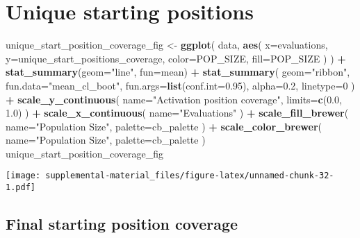 \documentclass[]{book}
\newenvironment{Shaded}{\begin{snugshade}}{\end{snugshade}}
\newcommand{\DataTypeTok}[1]{\textcolor[rgb]{0.13,0.29,0.53}{#1}}
\newcommand{\DecValTok}[1]{\textcolor[rgb]{0.00,0.00,0.81}{#1}}
\newcommand{\FloatTok}[1]{\textcolor[rgb]{0.00,0.00,0.81}{#1}}
\newcommand{\KeywordTok}[1]{\textcolor[rgb]{0.13,0.29,0.53}{\textbf{#1}}}
\newcommand{\NormalTok}[1]{#1}
\newcommand{\OperatorTok}[1]{\textcolor[rgb]{0.81,0.36,0.00}{\textbf{#1}}}
\newcommand{\StringTok}[1]{\textcolor[rgb]{0.31,0.60,0.02}{#1}}
\begin{document}
\hypertarget{unique-starting-positions-2}{%
\section{Unique starting positions}\label{unique-starting-positions-2}}

\begin{Shaded}
\begin{Highlighting}[]
\NormalTok{unique_start_position_coverage_fig <-}\StringTok{ }\KeywordTok{ggplot}\NormalTok{(}
\NormalTok{    data,}
    \KeywordTok{aes}\NormalTok{(}
      \DataTypeTok{x=}\NormalTok{evaluations,}
      \DataTypeTok{y=}\NormalTok{unique_start_positions_coverage,}
      \DataTypeTok{color=}\NormalTok{POP_SIZE,}
      \DataTypeTok{fill=}\NormalTok{POP_SIZE}
\NormalTok{    )}
\NormalTok{  ) }\OperatorTok{+}
\StringTok{  }\KeywordTok{stat_summary}\NormalTok{(}\DataTypeTok{geom=}\StringTok{"line"}\NormalTok{, }\DataTypeTok{fun=}\NormalTok{mean) }\OperatorTok{+}
\StringTok{  }\KeywordTok{stat_summary}\NormalTok{(}
    \DataTypeTok{geom=}\StringTok{"ribbon"}\NormalTok{,}
    \DataTypeTok{fun.data=}\StringTok{"mean_cl_boot"}\NormalTok{,}
    \DataTypeTok{fun.args=}\KeywordTok{list}\NormalTok{(}\DataTypeTok{conf.int=}\FloatTok{0.95}\NormalTok{),}
    \DataTypeTok{alpha=}\FloatTok{0.2}\NormalTok{,}
    \DataTypeTok{linetype=}\DecValTok{0}
\NormalTok{  ) }\OperatorTok{+}
\StringTok{  }\KeywordTok{scale_y_continuous}\NormalTok{(}
    \DataTypeTok{name=}\StringTok{"Activation position coverage"}\NormalTok{,}
    \DataTypeTok{limits=}\KeywordTok{c}\NormalTok{(}\FloatTok{0.0}\NormalTok{, }\FloatTok{1.0}\NormalTok{)}
\NormalTok{  ) }\OperatorTok{+}
\StringTok{  }\KeywordTok{scale_x_continuous}\NormalTok{(}
    \DataTypeTok{name=}\StringTok{"Evaluations"}
\NormalTok{  ) }\OperatorTok{+}
\StringTok{  }\KeywordTok{scale_fill_brewer}\NormalTok{(}
    \DataTypeTok{name=}\StringTok{"Population Size"}\NormalTok{,}
    \DataTypeTok{palette=}\NormalTok{cb_palette}
\NormalTok{  ) }\OperatorTok{+}
\StringTok{  }\KeywordTok{scale_color_brewer}\NormalTok{(}
    \DataTypeTok{name=}\StringTok{"Population Size"}\NormalTok{,}
    \DataTypeTok{palette=}\NormalTok{cb_palette}
\NormalTok{  )}
\NormalTok{unique_start_position_coverage_fig}
\end{Highlighting}
\end{Shaded}

\texttt{[image: supplemental-material\_files/figure-latex/unnamed-chunk-32-1.pdf]}

\hypertarget{final-starting-position-coverage-2}{%
\subsection{Final starting position coverage}\label{final-starting-position-coverage-2}}
\end{document}
